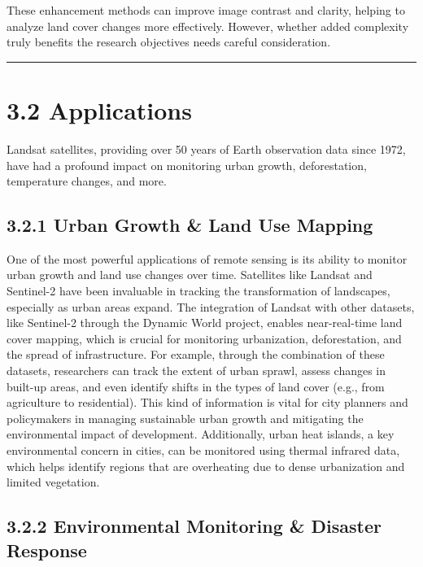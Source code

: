 \documentclass[
  letterpaper,
  DIV=11,
  numbers=noendperiod]{scrreprt}
\begin{document}
These enhancement methods can improve image contrast and clarity,
helping to analyze land cover changes more effectively. However, whether
added complexity truly benefits the research objectives needs careful
consideration.

\begin{center}\rule{0.5\linewidth}{0.5pt}\end{center}

\section{3.2 Applications}\label{applications-1}

Landsat satellites, providing over 50 years of Earth observation data
since 1972, have had a profound impact on monitoring urban growth,
deforestation, temperature changes, and more.

\subsection{3.2.1 Urban Growth \& Land Use
Mapping}\label{urban-growth-land-use-mapping}

One of the most powerful applications of remote sensing is its ability
to monitor urban growth and land use changes over time. Satellites like
Landsat and Sentinel-2 have been invaluable in tracking the
transformation of landscapes, especially as urban areas expand. The
integration of Landsat with other datasets, like Sentinel-2 through the
Dynamic World project, enables near-real-time land cover mapping, which
is crucial for monitoring urbanization, deforestation, and the spread of
infrastructure. For example, through the combination of these datasets,
researchers can track the extent of urban sprawl, assess changes in
built-up areas, and even identify shifts in the types of land cover
(e.g., from agriculture to residential). This kind of information is
vital for city planners and policymakers in managing sustainable urban
growth and mitigating the environmental impact of development.
Additionally, urban heat islands, a key environmental concern in cities,
can be monitored using thermal infrared data, which helps identify
regions that are overheating due to dense urbanization and limited
vegetation.

\subsection{3.2.2 Environmental Monitoring \& Disaster
Response}\label{environmental-monitoring-disaster-response}
\end{document}
